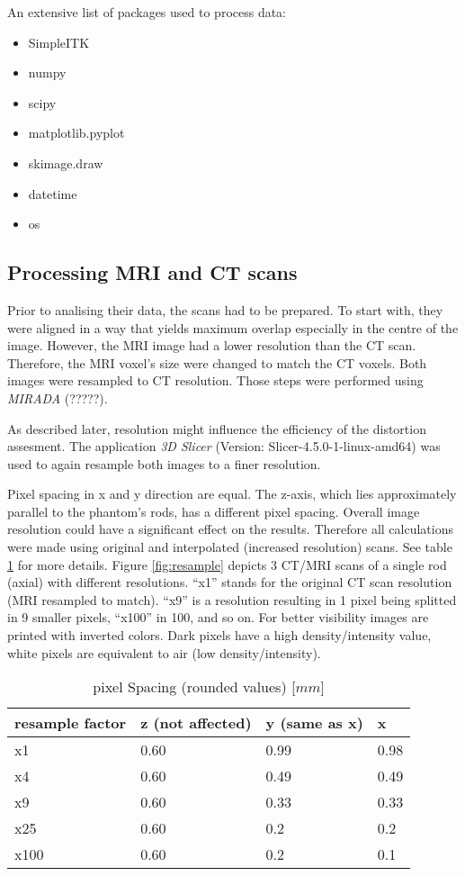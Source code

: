 An extensive list of packages used to process data:
\begin{itemize}
 \item SimpleITK
 \item numpy
 \item scipy
 \item matplotlib.pyplot \cite{Hunter2007}
 \item skimage.draw
 \item datetime
 \item os
\end{itemize}

\subsection{Processing MRI and CT scans}

Prior to analising their data, the scans had to be prepared.
To start with, they were aligned in a way that yields maximum overlap especially in the centre of the image.
However, the MRI image had a lower resolution than the CT scan.
Therefore, the MRI voxel's size were changed to match the CT voxels. Both images were resampled to CT resolution.
Those steps were performed using \textit{MIRADA} (?????).

As described later, resolution might influence the efficiency of the distortion assesment.
The application \textit{3D Slicer} (Version: Slicer-4.5.0-1-linux-amd64) was used to again resample both images to a finer resolution.

Pixel spacing in x and y direction are equal. The z-axis, which lies approximately parallel to the phantom's rods, has a different pixel spacing.
Overall image resolution could have a significant effect on the results. Therefore all calculations were made using original and interpolated (increased resolution) scans.
See table \ref{tab:spacing} for more details. Figure \ref{fig:resample} depicts 3 CT/MRI scans of a single rod (axial) with different resolutions.
``x1'' stands for the original CT scan resolution (MRI resampled to match).
``x9'' is a resolution resulting in 1 pixel being splitted in 9 smaller pixels, ``x100'' in 100, and so on.
For better visibility images are printed with inverted colors. Dark pixels have a high density/intensity value, white pixels are equivalent to air (low density/intensity).

\begin{table}[!htb]
\centering
\begin{tabular}{l|l|l|l}
resample factor  & z (not affected) &  y (same as x) & x \\
\toprule
x1     & 0.60 & 0.99	& 0.98	\\
x4     & 0.60 & 0.49	& 0.49	\\
x9     & 0.60 & 0.33	& 0.33	\\
x25    & 0.60 & 0.2 	& 0.2	\\
x100   & 0.60 & 0.2 	& 0.1
\end{tabular}
\caption{pixel Spacing (rounded values) [$mm$]}
\label{tab:spacing}
\end{table}


